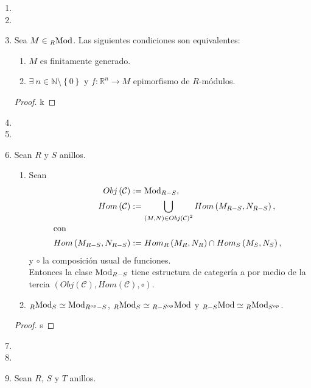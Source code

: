 \documentclass{article}
\newcommand{\lrprth}[1]{
	\left(#1\right)
}
\newcommand{\lrbrack}[1]{
	\left\{#1\right\}
}
\newcommand{\genlin}[1]{
	\mathscr{L}\lrprth{#1}
}
\newcommand{\opst}[1]{
	{#1}^{op}
}
\newcommand{\ringmod}[3]{
	\if#3l
	{}_{#1}#2
	\else
	\if#3r
	#2_{#1}
	\fi
	\fi
}
\newcommand{\ringbimod}[4]{
	\if#4l
	{}_{#1-#2}#3
	\else
	\if#4r
	#3_{#1-#2}
	\else 
	\ifstrequal{#4}{lr}{
		{}_{#1}#3_{#2}
	}
	\fi
	\fi
}
\theoremstyle{definition}
\theoremstyle{plain}
\theoremstyle{plain}
\theoremstyle{definition}
\theoremstyle{definition}
\theoremstyle{definition}
\theoremstyle{definition}
\theoremstyle{definition}
\theoremstyle{definition}
\begin{document}
\begin{enumerate}
\begin{proof}
\begin{equation*}
		\therefore\ \lrprth{\genlin{M},\leq}\text{ es un reticulado completo.}
	\end{equation*}
\end{proof}
\item\item
\item Sea $M\in\ringmod{R}{\text{Mod}}{l}$. Las siguientes condiciones son equivalentes:
\begin{enumerate}[label=(\alph*)]
	\item $M$ es finitamente generado.
	\item $\exists\ n\in\mathbb{N}\setminus\lrbrack{0}$ y $f:\mathbb{R}^n\rightarrow M$ epimorfismo de $R$-módulos.
\end{enumerate}
\begin{proof}
	k
\end{proof}
\item\item
\item Sean $R$ y $S$ anillos.
\begin{enumerate}[label=(\alph*)]
	\item Sean 
	\begin{align*}
		Obj\lrprth{\mathcal{C}}&:=\ringbimod{R}{S}{\text{Mod}}{r},\\
		Hom\lrprth{\mathcal{C}}&:=\bigcup_{\lrprth{M,N}\in Obj\lrprth{\mathcal{C}}^2}Hom\lrprth{\ringbimod{R}{S}{M}{r},\ringbimod{R}{S}{N}{r}},\\
		\intertext{con}
		Hom\lrprth{\ringbimod{R}{S}{M}{r},\ringbimod{R}{S}{N}{r}}&:=Hom_R\lrprth{\ringmod{R}{M}{r},\ringmod{R}{N}{r}}\cap Hom_S\lrprth{\ringmod{S}{M}{r},\ringmod{S}{N}{r}},
	\end{align*}
	y $\circ$ la composición usual de funciones.\\ Entonces la clase $\ringbimod{R}{S}{\text{Mod}}{r}$ tiene estructura de categería a por medio de la tercia $\lrprth{Obj\lrprth{\mathcal{C}},Hom\lrprth{\mathcal{C}},\circ}$.
	\item $\ringbimod{R}{S}{\text{Mod}}{lr}\simeq\ringbimod{\opst{R}}{S}{\text{Mod}}{r}$, $\ringbimod{R}{S}{\text{Mod}}{lr}\simeq\ringbimod{R}{\opst{S}}{\text{Mod}}{l}$ y $\ringbimod{R}{S}{\text{Mod}}{l}\simeq\ringbimod{R}{\opst{S}}{\text{Mod}}{lr}$.
\end{enumerate}
\begin{proof}
	s
\end{proof}
\item\item
\item Sean $R$, $S$ y $T$ anillos.

\end{enumerate}
\end{document}
